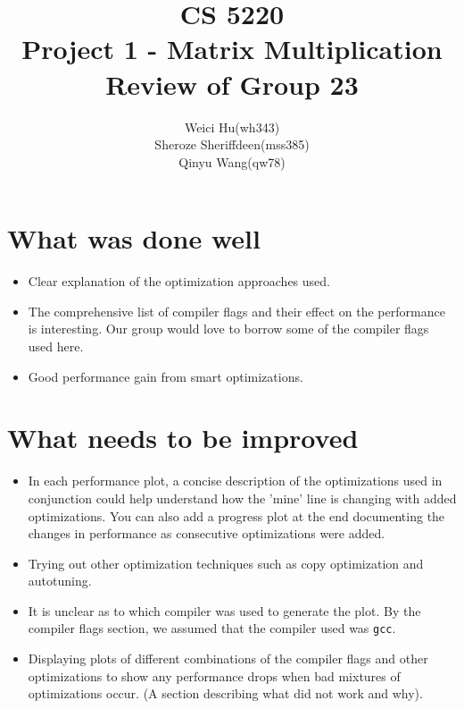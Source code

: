 \documentclass[11pt]{article}
\theoremstyle{plain}
\theoremstyle{definition}
\begin{document}
\title{CS 5220\\ Project 1 - Matrix Multiplication Review of Group 23}
\author{Weici Hu(wh343)\\ Sheroze Sheriffdeen(mss385)\\ Qinyu Wang(qw78)}
\maketitle

\section*{What was done well}
\begin{itemize}
	\item Clear explanation of the optimization approaches used.
	\item The comprehensive list of compiler flags and their effect on the performance is interesting. Our group would love to borrow some of the compiler flags used here. 
	\item Good performance gain from smart optimizations.
\end{itemize}
\section*{What needs to be improved}
\begin{itemize}
	\item In each performance plot, a concise description of the optimizations used in conjunction could help understand how the 'mine' line is changing with added optimizations. You can also add a progress plot at the end documenting the changes in performance as consecutive optimizations were added.
	\item Trying out other optimization techniques such as copy optimization and autotuning.
	\item It is unclear as to which compiler was used to generate the plot. By the compiler flags section, we assumed that the compiler used was \texttt{gcc}.
	\item Displaying plots of different combinations of the compiler flags and other optimizations to show any performance drops when bad mixtures of optimizations occur. (A section describing what did not work and why).
\end{itemize}



 
 
\end{document}
